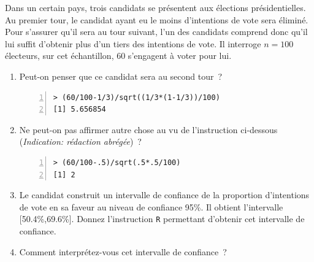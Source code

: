 \documentclass[10pt]{report}
\begin{document}
\begin{exercice}

Dans un certain pays, trois candidats se présentent aux élections présidentielles. Au premier tour, le candidat ayant eu le moins d'intentions de vote sera éliminé. Pour s'assurer qu'il sera au tour suivant, l'un des candidats comprend donc qu'il lui suffit d'obtenir plus d'un tiers des intentions de vote. Il interroge $n=100$ électeurs, sur cet échantillon, 60 s'engagent à voter pour lui.

\begin{enumerate}
\item Peut-on penser que ce candidat sera au second tour~?

\IndicR
\begin{Verbatim}[frame=leftline,fontfamily=tt,fontshape=n,numbers=left]
> (60/100-1/3)/sqrt((1/3*(1-1/3))/100)
[1] 5.656854
\end{Verbatim}





\item Ne peut-on pas affirmer autre chose au vu de l'instruction ci-dessous (\textit{Indication: rédaction abrégée})~?

\IndicR
\begin{Verbatim}[frame=leftline,fontfamily=tt,fontshape=n,numbers=left]
> (60/100-.5)/sqrt(.5*.5/100)
[1] 2
\end{Verbatim}




\item Le candidat construit un intervalle de confiance de la proportion d'intentions de vote en sa faveur au niveau de confiance 95\%. Il obtient l'intervalle [50.4\%,69.6\%]. Donnez l'instruction \texttt{R} permettant d'obtenir cet intervalle de confiance.


 


\item Comment interprétez-vous cet intervalle de confiance~?





\end{enumerate}
\end{exercice}
\end{document}
